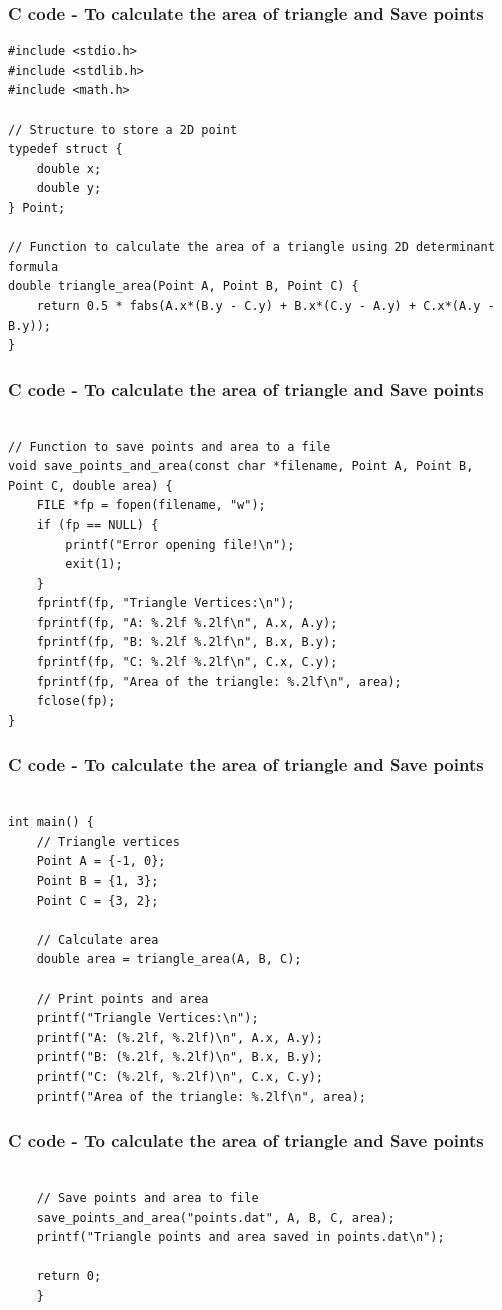 \documentclass{beamer}
\begin{document}
\begin{frame}[fragile]                            
\frametitle{C code - To calculate the area of triangle and Save points}                
\begin{lstlisting}
#include <stdio.h>
#include <stdlib.h>
#include <math.h>

// Structure to store a 2D point
typedef struct {
    double x;
    double y;
} Point;

// Function to calculate the area of a triangle using 2D determinant formula
double triangle_area(Point A, Point B, Point C) {
    return 0.5 * fabs(A.x*(B.y - C.y) + B.x*(C.y - A.y) + C.x*(A.y - B.y));
}
\end{lstlisting}
\end{frame}
\begin{frame}[fragile]                            
\frametitle{C code - To calculate the area of triangle and Save points}                
\begin{lstlisting}

// Function to save points and area to a file
void save_points_and_area(const char *filename, Point A, Point B, Point C, double area) {
    FILE *fp = fopen(filename, "w");
    if (fp == NULL) {
        printf("Error opening file!\n");
        exit(1);
    }
    fprintf(fp, "Triangle Vertices:\n");
    fprintf(fp, "A: %.2lf %.2lf\n", A.x, A.y);
    fprintf(fp, "B: %.2lf %.2lf\n", B.x, B.y);
    fprintf(fp, "C: %.2lf %.2lf\n", C.x, C.y);
    fprintf(fp, "Area of the triangle: %.2lf\n", area);
    fclose(fp);
}
\end{lstlisting}
\end{frame}
\begin{frame}[fragile]                            
\frametitle{C code - To calculate the area of triangle and Save points}                
\begin{lstlisting}

int main() {
    // Triangle vertices
    Point A = {-1, 0};
    Point B = {1, 3};
    Point C = {3, 2};

    // Calculate area
    double area = triangle_area(A, B, C);

    // Print points and area
    printf("Triangle Vertices:\n");
    printf("A: (%.2lf, %.2lf)\n", A.x, A.y);
    printf("B: (%.2lf, %.2lf)\n", B.x, B.y);
    printf("C: (%.2lf, %.2lf)\n", C.x, C.y);
    printf("Area of the triangle: %.2lf\n", area);
\end{lstlisting}
\end{frame}
\begin{frame}[fragile]                            
\frametitle{C code - To calculate the area of triangle and Save points}                
\begin{lstlisting}

    // Save points and area to file
    save_points_and_area("points.dat", A, B, C, area);
    printf("Triangle points and area saved in points.dat\n");

    return 0;
    }
\end{lstlisting}
\end{frame}
\end{document}
